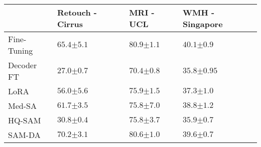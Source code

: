 \begin{table}[htbp]
\centering
\begin{tabular}{@{}p{3cm}P{2.4cm}P{2cm}P{2.6cm}@{}}
\toprule
 & Retouch - Cirrus & MRI - UCL & WMH - Singapore \\ \midrule
Fine-Tuning & $65.4{\scriptstyle \pm 5.1}$ & $80.9{\scriptstyle \pm 1.1}$ & $40.1{\scriptstyle \pm 0.9}$ \\ \midrule
Decoder FT & $27.0{\scriptstyle \pm 0.7}$ & $70.4{\scriptstyle \pm 0.8}$ & $35.8{\scriptstyle \pm 0.95}$ \\
LoRA~{\footnotesize\parencite{hu2022lora}} & $56.0{\scriptstyle \pm 5.6}$ & $75.9{\scriptstyle \pm 1.5}$ & $37.3{\scriptstyle \pm 1.0}$ \\
Med-SA~{\footnotesize\parencite{wu2023medical}} & $61.7{\scriptstyle \pm 3.5}$ & $75.8{\scriptstyle \pm 7.0}$ & $38.8{\scriptstyle \pm 1.2}$ \\
HQ-SAM~{\footnotesize\parencite{ke2024segment}} & $30.8{\scriptstyle \pm 0.4}$ & $75.8{\scriptstyle \pm 3.7}$ & $35.9{\scriptstyle \pm 0.7}$ \\ \midrule
SAM-DA & $\mathbf{70.2}{\scriptstyle \pm 3.1}$ & $\mathbf{80.6}{\scriptstyle \pm 1.0}$ & $\mathbf{39.6}{\scriptstyle \pm 0.7}$ \\ \bottomrule
\end{tabular}
\end{table}